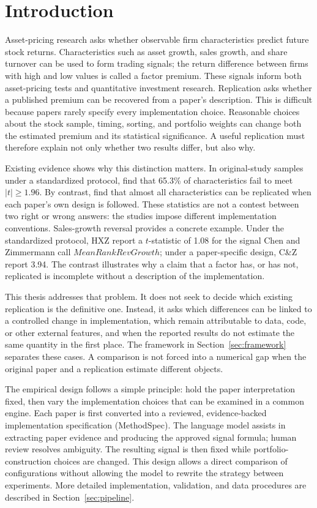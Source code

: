\section{Introduction}
\label{sec:intro}

Asset-pricing research asks whether observable firm characteristics predict
future stock returns. Characteristics such as asset growth, sales growth, and
share turnover can be used to form trading signals; the return difference
between firms with high and low values is called a factor premium. These
signals inform both asset-pricing tests and quantitative investment research.
Replication asks whether a published premium can be recovered from a paper's
description. This is difficult because papers rarely specify every
implementation choice. Reasonable choices about the stock sample, timing,
sorting, and portfolio weights can change both the estimated premium and its
statistical significance. A useful replication must therefore explain not only
whether two results differ, but also why.

Existing evidence shows why this distinction matters. In original-study
samples under a standardized protocol, \citet{HouXueZhang2020} find that
65.3\% of characteristics fail to meet $|t|\geq1.96$. By contrast,
\citet{ChenZimmermann2022} find that almost all characteristics can be
replicated when each paper's own design is followed. These statistics are not
a contest between two right or wrong answers: the studies impose different
implementation conventions. Sales-growth reversal provides a concrete example.
Under the standardized protocol, HXZ report a $t$-statistic of 1.08 for the
signal Chen and Zimmermann call $\mathit{MeanRankRevGrowth}$; under a
paper-specific design, C\&Z report 3.94. The contrast illustrates why a claim
that a factor has, or has not, replicated is incomplete without a description
of the implementation.

This thesis addresses that problem. It does not seek to decide which existing
replication is the definitive one. Instead, it asks which differences can be
linked to a controlled change in implementation, which remain attributable to
data, code, or other external features, and when the reported results do not
estimate the same quantity in the first place. The framework in
Section~\ref{sec:framework} separates these cases. A comparison is not forced
into a numerical gap when the original paper and a replication estimate
different objects.

The empirical design follows a simple principle: hold the paper
interpretation fixed, then vary the implementation choices that can be
examined in a common engine. Each paper is first converted into a reviewed,
evidence-backed implementation specification (MethodSpec). The language model
assists in extracting paper evidence and producing the approved signal formula;
human review resolves ambiguity. The resulting signal is then fixed while
portfolio-construction choices are changed. This design allows a direct
comparison of configurations without allowing the model to rewrite the
strategy between experiments. More detailed implementation, validation, and
data procedures are described in Section~\ref{sec:pipeline}.

